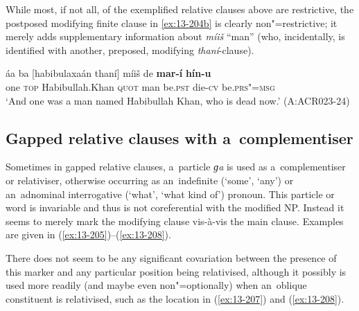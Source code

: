 While most, if not all, of the exemplified relative clauses above are restrictive, the postposed modifying finite clause in \ref{ex:13-204b} is clearly non"=restrictive; it merely adds supplementary information about \textit{míiš} ``man'' (who, incidentally, is identified with another, preposed, modifying \textit
{thaní}-clause). 

\begin{exe}
\ex
\label{ex:13-204b}
\gll áa ba [habibulaxaán thaní] míiš de \textbf{mar-í} \textbf{hín-u}\\
one \textsc{top} Habibullah.Khan \textsc{quot} man be.\textsc{pst}   die-\textsc{cv} be.\textsc{prs"=msg}\\
\glt `And one was a man named Habibullah Khan, who is dead now.' (A:ACR023-24)
\end{exe}



\subsection{Gapped relative clauses with a~complementiser}
\label{subsec:13-6-4}


Sometimes in gapped relative clauses, a~particle \textit{ɡa} is used as a~complementiser or relativiser, otherwise occurring as an~indefinite (`some', `any') or an~adnominal interrogative (`what', `what kind of') pronoun. This particle or word is invariable and thus is not coreferential with the modified NP. Instead it seems to merely mark the modifying clause vis-à-vis the main clause. Examples are given in (\ref{ex:13-205})--(\ref{ex:13-208}).


There does not seem to be any significant covariation between the presence of this marker and any particular position being relativised, although it possibly is used more readily (and maybe even non"=optionally) when an~oblique constituent is relativised, such as the location in (\ref{ex:13-207}) and (\ref{ex:13-208}). 

